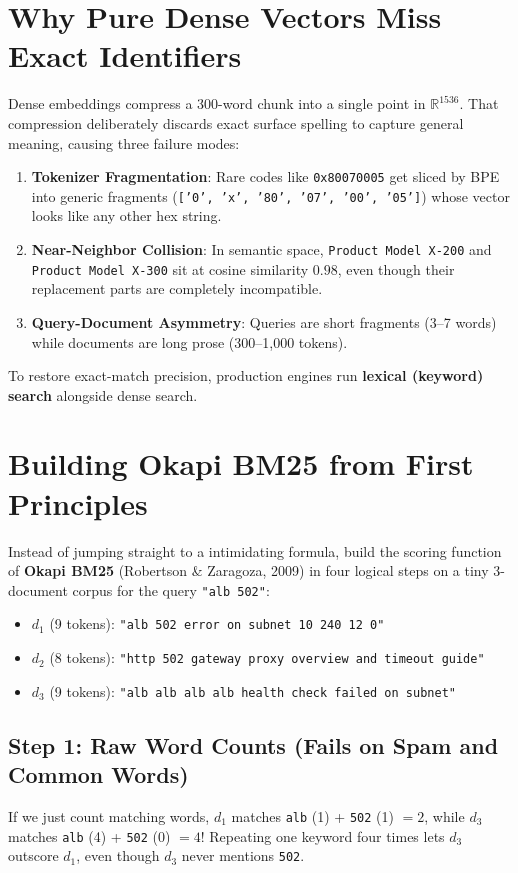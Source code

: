 \section{Why Pure Dense Vectors Miss Exact Identifiers}

Dense embeddings compress a 300-word chunk into a single point in $\mathbb{R}^{1536}$. That compression deliberately discards exact surface spelling to capture general meaning, causing three failure modes:
\begin{enumerate}[leftmargin=18pt]
  \item \textbf{Tokenizer Fragmentation}: Rare codes like \texttt{0x80070005} get sliced by BPE into generic fragments (\texttt{['0', 'x', '80', '07', '00', '05']}) whose vector looks like any other hex string.
  \item \textbf{Near-Neighbor Collision}: In semantic space, \texttt{Product Model X-200} and \texttt{Product Model X-300} sit at cosine similarity $0.98$, even though their replacement parts are completely incompatible.
  \item \textbf{Query-Document Asymmetry}: Queries are short fragments (3--7 words) while documents are long prose (300--1,000 tokens).
\end{enumerate}

To restore exact-match precision, production engines run \textbf{lexical (keyword) search} alongside dense search.

\section{Building Okapi BM25 from First Principles}

Instead of jumping straight to a intimidating formula, build the scoring function of \textbf{Okapi BM25} (Robertson \& Zaragoza, 2009) in four logical steps on a tiny 3-document corpus for the query \texttt{"alb 502"}:
\begin{itemize}[leftmargin=18pt]
  \item $d_1$ (9 tokens): \texttt{"alb 502 error on subnet 10 240 12 0"}
  \item $d_2$ (8 tokens): \texttt{"http 502 gateway proxy overview and timeout guide"}
  \item $d_3$ (9 tokens): \texttt{"alb alb alb alb health check failed on subnet"}
\end{itemize}

\subsection*{Step 1: Raw Word Counts (Fails on Spam and Common Words)}
If we just count matching words, $d_1$ matches \texttt{alb} (1) + \texttt{502} (1) $= 2$, while $d_3$ matches \texttt{alb} (4) + \texttt{502} (0) $= 4$! Repeating one keyword four times lets $d_3$ outscore $d_1$, even though $d_3$ never mentions \texttt{502}.

